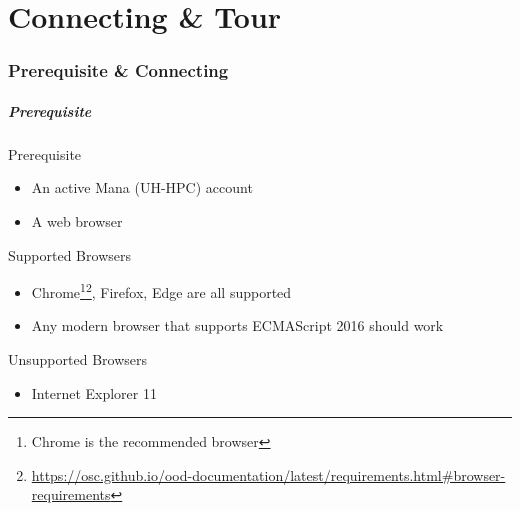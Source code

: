 \part{Connecting \& Tour}
\begin{frame}
			 \partpage
\end{frame}


\section[Connecting]{Prerequisite \& Connecting}

\begin{frame}
\frametitle{Prerequisite}
		\begin{block}{Prerequisite}
			\begin{itemize}
				\item An active Mana (UH-HPC) account 
				\item A web browser 
			\end{itemize}
			\end{block}
			\begin{exampleblock}{Supported Browsers}
			\begin{itemize}
				\item Chrome\footnote[1,frame]{\tiny Chrome is the recommended browser}\footnote[2,frame]{\tiny \url{https://osc.github.io/ood-documentation/latest/requirements.html\#browser-requirements}}, Firefox, Edge are all supported
				\item Any modern browser that supports ECMAScript 2016 should work
		\end{itemize}
		\end{exampleblock}
			\begin{alertblock}{Unsupported Browsers}
			\begin{itemize}
				\item Internet Explorer 11
		\end{itemize}
				\end{alertblock}
\end{frame}

